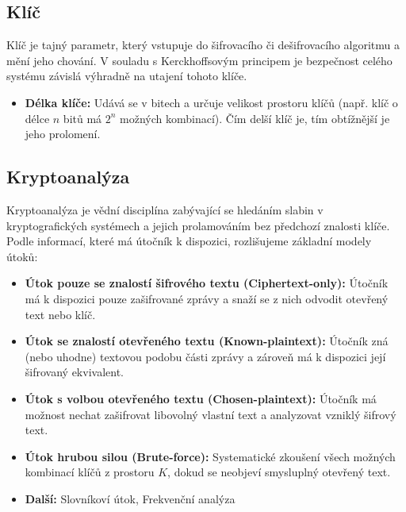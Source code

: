 \subsection{Klíč}
Klíč je tajný parametr, který vstupuje do šifrovacího či dešifrovacího algoritmu a mění jeho chování. V souladu s Kerckhoffsovým principem je bezpečnost celého systému závislá výhradně na utajení tohoto klíče.
\begin{itemize}
    \item \textbf{Délka klíče:} Udává se v bitech a určuje velikost prostoru klíčů (např. klíč o délce $n$ bitů má $2^n$ možných kombinací). Čím delší klíč je, tím obtížnější je jeho prolomení.
\end{itemize}

\subsection{Kryptoanalýza}
Kryptoanalýza je vědní disciplína zabývající se hledáním slabin v kryptografických systémech a jejich prolamováním bez předchozí znalosti klíče. Podle informací, které má útočník k dispozici, rozlišujeme základní modely útoků:
\begin{itemize}
    \item \textbf{Útok pouze se znalostí šifrového textu (Ciphertext-only):} Útočník má k dispozici pouze zašifrované zprávy a snaží se z nich odvodit otevřený text nebo klíč.
    \item \textbf{Útok se znalostí otevřeného textu (Known-plaintext):} Útočník zná (nebo uhodne) textovou podobu části zprávy a zároveň má k dispozici její šifrovaný ekvivalent.
    \item \textbf{Útok s volbou otevřeného textu (Chosen-plaintext):} Útočník má možnost nechat zašifrovat libovolný vlastní text a analyzovat vzniklý šifrový text.
    \item \textbf{Útok hrubou silou (Brute-force):} Systematické zkoušení všech možných kombinací klíčů z prostoru $K$, dokud se neobjeví smysluplný otevřený text.
    \item \textbf{Další:} Slovníkoví útok, Frekvenční analýza
\end{itemize}

